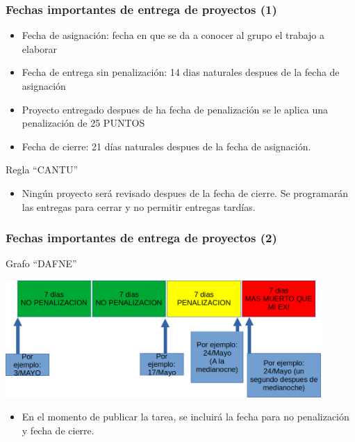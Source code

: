 
\begin{frame}
\frametitle{Fechas importantes de entrega de proyectos (1)}

\begin{itemize}
\item Fecha de asignación: fecha en que se da a conocer al grupo el trabajo a elaborar
\item Fecha de entrega sin penalización: 14 dias naturales despues de la fecha de asignación
\item Proyecto entregado despues de ha fecha de penalización se le aplica una penalización de 25 PUNTOS
\item Fecha de cierre: 21 días naturales despues de la fecha de asignación. 
\end{itemize}
\begin{block}{Regla ``CANTU''}
\begin{itemize}
\item Ningún proyecto será revisado despues de la fecha de cierre. Se programarán las entregas para cerrar y no permitir entregas tardías. 
\end{itemize}
\end{block}
\end{frame}

\begin{frame}
\frametitle{Fechas importantes de entrega de proyectos (2)}
\begin{block}{Grafo ``DAFNE''}
\begin{center}
\includegraphics[width=12cm]{FechasEntrega/Grafo_Fechas.png}
\end{center}
\begin{itemize}
\item En el momento de publicar la tarea, se incluirá la fecha para no penalización y fecha de cierre.
\end{itemize}
\end{block}

\end{frame}


